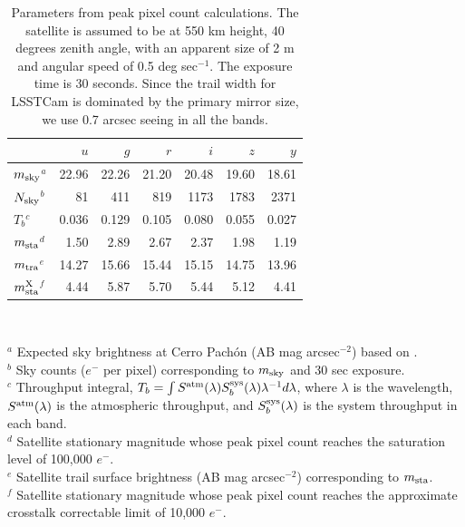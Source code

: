 \documentclass[twocolumn,trackchanges]{aastex63}
\begin{document}
\begin{table}[ht]
\centering
\caption{Parameters from peak pixel count calculations. The satellite is assumed to be at 550 km height, 40 degrees zenith angle, with an apparent size of 2 m and angular speed of 0.5 deg sec$^{-1}$. The exposure time is 30 seconds. Since the trail width for LSSTCam is dominated by the primary mirror size, we use 0.7 arcsec seeing in all the bands. \label{table:peake}}
\begin{tabular}{|l|r|r|r|r|r|r|}
\hline
 &     $u$ &    $g$ &     $r$  &     $i$   &     $z$   &    $y$  \\
\hline
    $m_{\rm sky}$$^a$             &      22.96  & 22.26  & 21.20  & 20.48  & 19.60  & 18.61  \\
    $N_{\rm sky}$$^b$            & 81  & 411  & 819  & 1173  & 1783  & 2371    \\
    $T_b$$^c$   & 0.036  & 0.129  & 0.105  & 0.080  & 0.055  & 0.027   \\
     $m_{\rm sta}$$^d$     & 1.50  & 2.89  & 2.67  & 2.37  & 1.98  & 1.19     \\
    $m_{\rm tra}$$^e$   & 14.27  & 15.66  & 15.44  & 15.15  & 14.75  & 13.96     \\
    $m_{\rm sta}^{\rm X}$$^f$ & 4.44  & 5.87  & 5.70  & 5.44  & 5.12  & 4.41  \\
\hline
\end{tabular}
\\ \vskip 0.05in

\flushleft
$^a$ Expected sky brightness at Cerro Pach\'on (AB mag arcsec$^{-2}$) based on \cite{2016SPIE.9910E..1AY}.  \\
$^b$ Sky counts ($e^-$ per pixel) corresponding to $m_{\rm sky}$ and 30 sec exposure. \\
$^c$ Throughput integral, $T_b = \int S^{\rm atm}(\lambda) S^{\rm sys}_b(\lambda) \lambda^{-1}d\lambda$, where $\lambda$ is the wavelength, $S^{\rm atm}(\lambda)$ is the atmospheric throughput, and $S^{\rm sys}_b(\lambda)$ is the system throughput in each band. \\
$^d$ Satellite stationary magnitude whose peak pixel count reaches the saturation level of 100,000 $e^-$. \\
$^e$  Satellite trail surface brightness (AB mag arcsec$^{-2}$) corresponding to $m_{\rm sta}$.\\
$^f$  Satellite stationary magnitude whose peak pixel count reaches the approximate crosstalk correctable limit of 10,000 $e^-$.  \\
\vskip 0.5in
\end{table}
\end{document}

